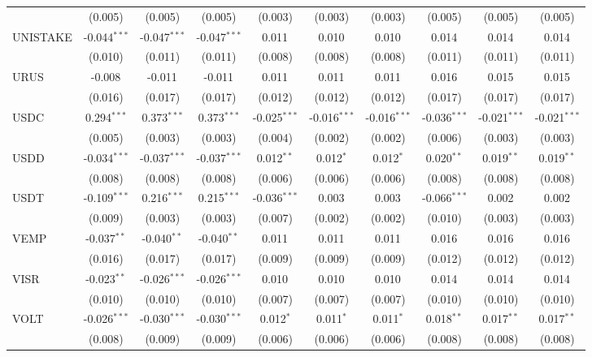 \begin{table}[!htbp]
\begin{tabular}{@{\extracolsep{5pt}}lccccccccc}
  & (0.005) & (0.005) & (0.005) & (0.003) & (0.003) & (0.003) & (0.005) & (0.005) & (0.005) \\
 UNISTAKE & -0.044$^{***}$ & -0.047$^{***}$ & -0.047$^{***}$ & 0.011$^{}$ & 0.010$^{}$ & 0.010$^{}$ & 0.014$^{}$ & 0.014$^{}$ & 0.014$^{}$ \\
  & (0.010) & (0.011) & (0.011) & (0.008) & (0.008) & (0.008) & (0.011) & (0.011) & (0.011) \\
 URUS & -0.008$^{}$ & -0.011$^{}$ & -0.011$^{}$ & 0.011$^{}$ & 0.011$^{}$ & 0.011$^{}$ & 0.016$^{}$ & 0.015$^{}$ & 0.015$^{}$ \\
  & (0.016) & (0.017) & (0.017) & (0.012) & (0.012) & (0.012) & (0.017) & (0.017) & (0.017) \\
 USDC & 0.294$^{***}$ & 0.373$^{***}$ & 0.373$^{***}$ & -0.025$^{***}$ & -0.016$^{***}$ & -0.016$^{***}$ & -0.036$^{***}$ & -0.021$^{***}$ & -0.021$^{***}$ \\
  & (0.005) & (0.003) & (0.003) & (0.004) & (0.002) & (0.002) & (0.006) & (0.003) & (0.003) \\
 USDD & -0.034$^{***}$ & -0.037$^{***}$ & -0.037$^{***}$ & 0.012$^{**}$ & 0.012$^{*}$ & 0.012$^{*}$ & 0.020$^{**}$ & 0.019$^{**}$ & 0.019$^{**}$ \\
  & (0.008) & (0.008) & (0.008) & (0.006) & (0.006) & (0.006) & (0.008) & (0.008) & (0.008) \\
 USDT & -0.109$^{***}$ & 0.216$^{***}$ & 0.215$^{***}$ & -0.036$^{***}$ & 0.003$^{}$ & 0.003$^{}$ & -0.066$^{***}$ & 0.002$^{}$ & 0.002$^{}$ \\
  & (0.009) & (0.003) & (0.003) & (0.007) & (0.002) & (0.002) & (0.010) & (0.003) & (0.003) \\
 VEMP & -0.037$^{**}$ & -0.040$^{**}$ & -0.040$^{**}$ & 0.011$^{}$ & 0.011$^{}$ & 0.011$^{}$ & 0.016$^{}$ & 0.016$^{}$ & 0.016$^{}$ \\
  & (0.016) & (0.017) & (0.017) & (0.009) & (0.009) & (0.009) & (0.012) & (0.012) & (0.012) \\
 VISR & -0.023$^{**}$ & -0.026$^{***}$ & -0.026$^{***}$ & 0.010$^{}$ & 0.010$^{}$ & 0.010$^{}$ & 0.014$^{}$ & 0.014$^{}$ & 0.014$^{}$ \\
  & (0.010) & (0.010) & (0.010) & (0.007) & (0.007) & (0.007) & (0.010) & (0.010) & (0.010) \\
 VOLT & -0.026$^{***}$ & -0.030$^{***}$ & -0.030$^{***}$ & 0.012$^{*}$ & 0.011$^{*}$ & 0.011$^{*}$ & 0.018$^{**}$ & 0.017$^{**}$ & 0.017$^{**}$ \\
  & (0.008) & (0.009) & (0.009) & (0.006) & (0.006) & (0.006) & (0.008) & (0.008) & (0.008) \\

\end{tabular}
\end{table}
